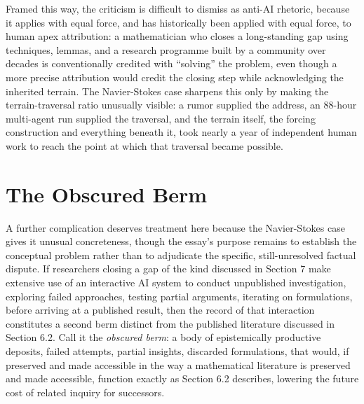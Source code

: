 \documentclass[11pt]{article}
\begin{document}
Framed this way, the criticism is difficult to dismiss as anti-AI rhetoric, because it applies with equal force, and has historically been applied with equal force, to human apex attribution: a mathematician who closes a long-standing gap using techniques, lemmas, and a research programme built by a community over decades is conventionally credited with ``solving'' the problem, even though a more precise attribution would credit the closing step while acknowledging the inherited terrain. The Navier-Stokes case sharpens this only by making the terrain-traversal ratio unusually visible: a rumor supplied the address, an 88-hour multi-agent run supplied the traversal, and the terrain itself, the forcing construction and everything beneath it, took nearly a year of independent human work to reach the point at which that traversal became possible.

\section{The Obscured Berm}

A further complication deserves treatment here because the Navier-Stokes case gives it unusual concreteness, though the essay's purpose remains to establish the conceptual problem rather than to adjudicate the specific, still-unresolved factual dispute. If researchers closing a gap of the kind discussed in Section 7 make extensive use of an interactive AI system to conduct unpublished investigation, exploring failed approaches, testing partial arguments, iterating on formulations, before arriving at a published result, then the record of that interaction constitutes a second berm distinct from the published literature discussed in Section 6.2. Call it the \emph{obscured berm}: a body of epistemically productive deposits, failed attempts, partial insights, discarded formulations, that would, if preserved and made accessible in the way a mathematical literature is preserved and made accessible, function exactly as Section 6.2 describes, lowering the future cost of related inquiry for successors.
\end{document}
